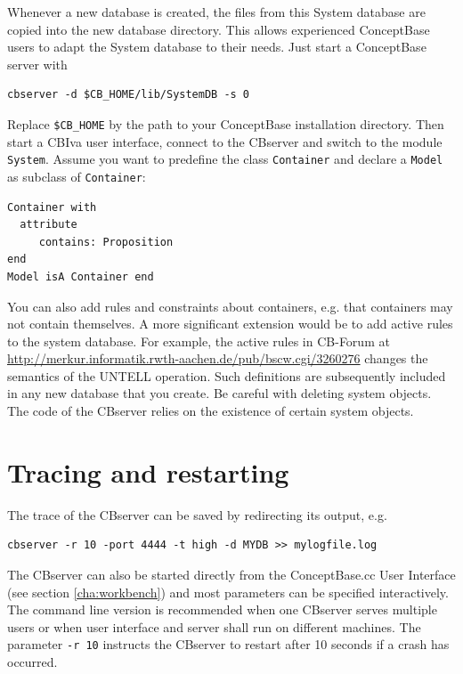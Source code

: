 Whenever a new database is created, the files from
this System database are copied into the new database directory. This allows experienced
ConceptBase users to adapt the System database to their needs. Just start a 
ConceptBase server with

\begin{verbatim}
cbserver -d $CB_HOME/lib/SystemDB -s 0
\end{verbatim}

Replace {\tt \$CB\_HOME} by the path to your ConceptBase installation directory.
Then start a CBIva user interface, connect to the CBserver and switch to the
module {\tt System}. Assume you want to predefine the class {\tt Container}
and declare a {\tt Model} as subclass of {\tt Container}:

\begin{verbatim}
Container with
  attribute
     contains: Proposition
end
Model isA Container end
\end{verbatim}

You can also add rules and constraints about containers, e.g. that containers
may not contain themselves.
A more significant extension would be to add active rules to the system database.
For example, the active rules
in CB-Forum at \url{http://merkur.informatik.rwth-aachen.de/pub/bscw.cgi/3260276}
changes the semantics of the UNTELL operation.
Such definitions are subsequently included in any new database that you create.
Be careful with deleting system objects. The code of the CBserver relies on
the existence of certain system objects. 


\section{Tracing and restarting}

\vspace{0.5cm}
The trace of the CBserver can be saved by redirecting its
output, e.g.

\begin{verbatim}
cbserver -r 10 -port 4444 -t high -d MYDB >> mylogfile.log
\end{verbatim}

The CBserver can also be started directly from the ConceptBase.cc
User Interface (see section \ref{cha:workbench}) and most parameters can
be specified interactively. The command line version is recommended when
one CBserver serves multiple users or when user interface and server shall run
on different machines.
The parameter {\tt -r 10} instructs the CBserver to restart after 10 seconds if 
a crash has occurred.




